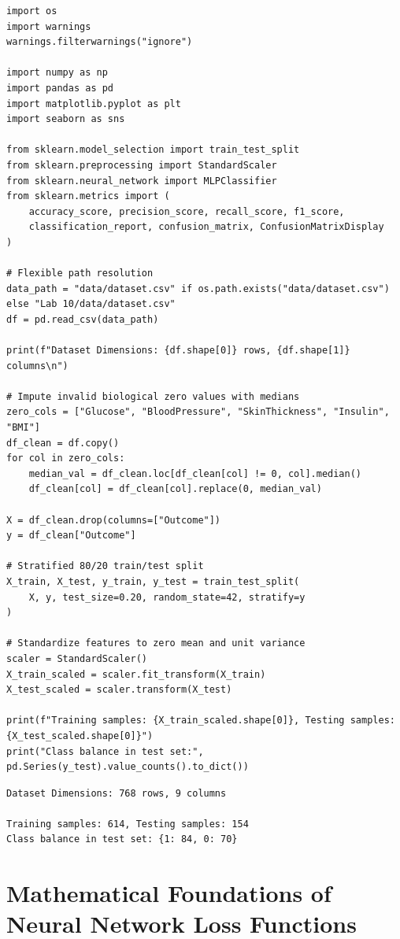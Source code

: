 \documentclass[12pt]{article}
\begin{document}
\begin{lstlisting}[style=code, caption={Dataset Ingestion, Missing Value Imputation, and Scaling}]
import os
import warnings
warnings.filterwarnings("ignore")

import numpy as np
import pandas as pd
import matplotlib.pyplot as plt
import seaborn as sns

from sklearn.model_selection import train_test_split
from sklearn.preprocessing import StandardScaler
from sklearn.neural_network import MLPClassifier
from sklearn.metrics import (
    accuracy_score, precision_score, recall_score, f1_score,
    classification_report, confusion_matrix, ConfusionMatrixDisplay
)

# Flexible path resolution
data_path = "data/dataset.csv" if os.path.exists("data/dataset.csv") else "Lab 10/data/dataset.csv"
df = pd.read_csv(data_path)

print(f"Dataset Dimensions: {df.shape[0]} rows, {df.shape[1]} columns\n")

# Impute invalid biological zero values with medians
zero_cols = ["Glucose", "BloodPressure", "SkinThickness", "Insulin", "BMI"]
df_clean = df.copy()
for col in zero_cols:
    median_val = df_clean.loc[df_clean[col] != 0, col].median()
    df_clean[col] = df_clean[col].replace(0, median_val)

X = df_clean.drop(columns=["Outcome"])
y = df_clean["Outcome"]

# Stratified 80/20 train/test split
X_train, X_test, y_train, y_test = train_test_split(
    X, y, test_size=0.20, random_state=42, stratify=y
)

# Standardize features to zero mean and unit variance
scaler = StandardScaler()
X_train_scaled = scaler.fit_transform(X_train)
X_test_scaled = scaler.transform(X_test)

print(f"Training samples: {X_train_scaled.shape[0]}, Testing samples: {X_test_scaled.shape[0]}")
print("Class balance in test set:", pd.Series(y_test).value_counts().to_dict())
\end{lstlisting}

\begin{lstlisting}[style=output, caption={Dataset Preprocessing and Split Output}]
Dataset Dimensions: 768 rows, 9 columns

Training samples: 614, Testing samples: 154
Class balance in test set: {1: 84, 0: 70}
\end{lstlisting}

\section{Mathematical Foundations of Neural Network Loss Functions}
\end{document}
